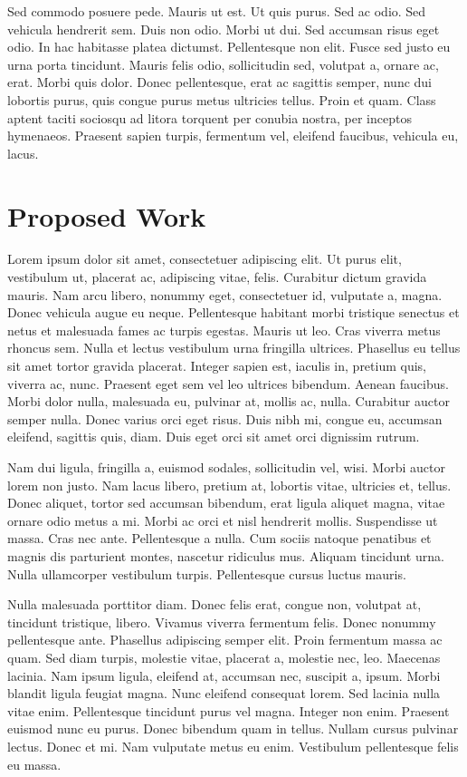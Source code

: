 \documentclass[12pt,a4paper,twoside,openright]{report}
\begin{document}
Sed commodo posuere pede. Mauris ut est. Ut quis purus. Sed ac odio. Sed vehicula hendrerit sem. Duis non odio. Morbi ut dui. Sed accumsan risus eget odio. In hac habitasse platea dictumst. Pellentesque non elit. Fusce sed justo eu urna porta tincidunt. Mauris felis odio, sollicitudin sed, volutpat a, ornare ac, erat. Morbi quis dolor. Donec pellentesque, erat ac sagittis semper, nunc dui lobortis purus, quis congue purus metus ultricies tellus. Proin et quam. Class aptent taciti sociosqu ad litora torquent per conubia nostra, per inceptos hymenaeos. Praesent sapien turpis, fermentum vel, eleifend faucibus, vehicula eu, lacus.

\cleardoublepage


\chapter{Proposed Work}
Lorem ipsum dolor sit amet, consectetuer adipiscing elit. Ut purus elit, vestibulum ut, placerat ac, adipiscing vitae, felis. Curabitur dictum gravida mauris. Nam arcu libero, nonummy eget, consectetuer id, vulputate a, magna. Donec vehicula augue eu neque. Pellentesque habitant morbi tristique senectus et netus et malesuada fames ac turpis egestas. Mauris ut leo. Cras viverra metus rhoncus sem. Nulla et lectus vestibulum urna fringilla ultrices. Phasellus eu tellus sit amet tortor gravida placerat. Integer sapien est, iaculis in, pretium quis, viverra ac, nunc. Praesent eget sem vel leo ultrices bibendum. Aenean faucibus. Morbi dolor nulla, malesuada eu, pulvinar at, mollis ac, nulla. Curabitur auctor semper nulla. Donec varius orci eget risus. Duis nibh mi, congue eu, accumsan eleifend, sagittis quis, diam. Duis eget orci sit amet orci dignissim rutrum.

Nam dui ligula, fringilla a, euismod sodales, sollicitudin vel, wisi. Morbi auctor lorem non justo. Nam lacus libero, pretium at, lobortis vitae, ultricies et, tellus. Donec aliquet, tortor sed accumsan bibendum, erat ligula aliquet magna, vitae ornare odio metus a mi. Morbi ac orci et nisl hendrerit mollis. Suspendisse ut massa. Cras nec ante. Pellentesque a nulla. Cum sociis natoque penatibus et magnis dis parturient montes, nascetur ridiculus mus. Aliquam tincidunt urna. Nulla ullamcorper vestibulum turpis. Pellentesque cursus luctus mauris.

Nulla malesuada porttitor diam. Donec felis erat, congue non, volutpat at, tincidunt tristique, libero. Vivamus viverra fermentum felis. Donec nonummy pellentesque ante. Phasellus adipiscing semper elit. Proin fermentum massa ac quam. Sed diam turpis, molestie vitae, placerat a, molestie nec, leo. Maecenas lacinia. Nam ipsum ligula, eleifend at, accumsan nec, suscipit a, ipsum. Morbi blandit ligula feugiat magna. Nunc eleifend consequat lorem. Sed lacinia nulla vitae enim. Pellentesque tincidunt purus vel magna. Integer non enim. Praesent euismod nunc eu purus. Donec bibendum quam in tellus. Nullam cursus pulvinar lectus. Donec et mi. Nam vulputate metus eu enim. Vestibulum pellentesque felis eu massa.
\end{document}
